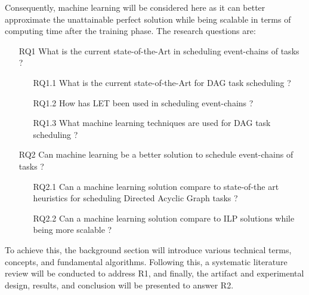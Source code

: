 Consequently, machine learning will be considered here as it can 
better approximate the unattainable perfect solution while being 
scalable in terms of computing time after the training phase. 
The research questions are:

\begin{itemize}
    \item [RQ1] What is the current state-of-the-Art in scheduling event-chains of tasks ?
            \begin{itemize}
                \item [RQ1.1] What is the current state-of-the-Art for DAG task scheduling ?
                \item [RQ1.2] How has LET been used in scheduling event-chains ?
                \item [RQ1.3] What machine learning  techniques are used for DAG task scheduling ?
            \end{itemize}
    \item [RQ2]  Can machine learning be a better solution to schedule event-chains of tasks ?
            \begin{itemize}
                \item [RQ2.1] Can a machine learning solution compare to state-of-the art heuristics for scheduling Directed Acyclic Graph tasks ?
                \item [RQ2.2] Can a machine learning solution compare to ILP solutions while being more scalable ?
            \end{itemize}    
\end{itemize}

To achieve this, the background section will introduce various 
technical terms, concepts, and fundamental algorithms. 
Following this, a systematic literature review will be conducted to address R1, 
and finally, the artifact and experimental design, results, and conclusion will 
be presented to answer R2.





